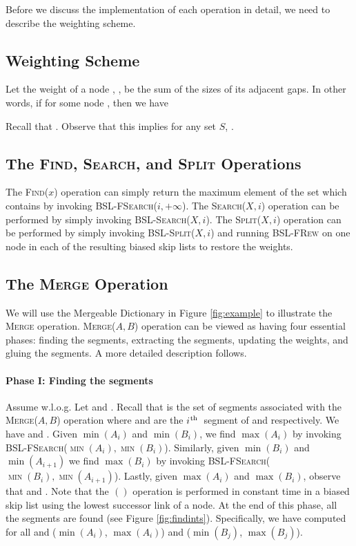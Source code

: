 \documentclass[11pt]{article}
\newcommand{\ens}[1]{\ensuremath{#1}}
\newcommand{\ith}{\ens{i^{\mbox{\hspace{.2mm}\scriptsize th}}}}
\newcommand{\Ds}{Mergeable Dictionary}
\newcommand{\kwMs}{Make-Set}
\newcommand{\kwSpl}{Split}
\newcommand{\kwUnion}{Merge}
\newcommand{\kwSrc}{Search}
\newcommand{\kwFind}{Find}
\newcommand{\Ms}{\mbox{\textsc{\kwMs}}}
\newcommand{\Spl}{\mbox{\textsc{\kwSpl}}}
\newcommand{\Splx}[2]{\mbox{\textsc{\kwSpl(\ensuremath{#1,#2})}}}
\newcommand{\Union}{\mbox{\textsc{\kwUnion{}}}}
\newcommand{\Unionx}[2]{\mbox{\textsc{\kwUnion(\ensuremath{#1,#2})}}}
\newcommand{\Src}{\mbox{\textsc{\kwSrc}}}
\newcommand{\Srcx}[2]{\mbox{\textsc{\kwSrc(\ensuremath{#1,#2})}}}
\newcommand{\Find}{\mbox{\textsc{\kwFind}}}
\newcommand{\Findx}[1]{\mbox{\textsc{\kwFind(\ensuremath{#1})}}}
\newcommand{\Bslfsrcx}[2]{\mbox{\textsc{BSL-FSearch(\ensuremath{#1,#2})}}}
\newcommand{\Bslfrew}{\mbox{\textsc{BSL-FRew}}}
\newcommand{\Bslsrcx}[2]{\mbox{\textsc{BSL-Search(\ensuremath{#1,#2})}}}
\newcommand{\Bslsplx}[2]{\mbox{\textsc{BSL-Split(\ensuremath{#1,#2})}}}
\newcommand{\segments}{{\segment}s}
\newcommand{\segment}{segment}
\newcommand{\intmax}[1]{\ensuremath{\max(\intl #1)}}
\newcommand{\intmin}[1]{\ensuremath{\min(\intl #1)}}
\newcommand{\intl}[1]{\ensuremath{#1}}
\newcommand{\set}[1]{\ensuremath{#1}}
\newcommand{\suc}[2]{\text{succ}\ensuremath{_{#1}(#2)}}
\newcommand{\hide}[1]{}
\begin{document}
  
Before we discuss the implementation of each operation in detail, we need to describe the weighting scheme. 

\subsection{Weighting Scheme} 
\label{subsec:DSWeights} 
Let the weight of a node , , be the sum of the sizes of its adjacent gaps. In other words, if  for some node , then we have 
 
Recall that . Observe that this implies for any set \set S, . 

\subsection{The \hide{\Ms{}, }\Find{}, \Src{}, and \Spl{} Operations} 
\label{subsec:DSOthers} 


The \Findx{x} operation can simply return the maximum element of the set which contains  by invoking \Bslfsrcx{i}{+\infty}. The \Srcx{X}{i} operation can be performed by simply invoking \Bslsrcx{X}{i}. The \Splx{X}{i} operation can be performed by simply invoking \Bslsplx{X}{i} and running \Bslfrew{} on one node in each of the resulting biased skip lists to restore the weights. 


\subsection{The \Union{} Operation} 
\label{subsec:DSUnion} 
We will use the \Ds{} in Figure \ref{fig:example} to illustrate the \Union{} operation. \Unionx{A}{B} operation can be viewed as having four essential phases: finding the \segments{}, extracting the \segments{}, updating the weights, and gluing the \segments{}. 
A more detailed description follows. 




\paragraph{Phase I: Finding the \segments{}} 
Assume  w.l.o.g. Let  and . Recall that  is the set of \segments{} associated with the \Unionx{A}{B} operation where  and  are the \ith\ \segment{} of  and  respectively. We have  and . Given \intmin{A_i} and \intmin{B_i}, we find \intmax{A_i} by invoking \Bslfsrcx{\intmin{A_i}}{\intmin{B_i}}. Similarly, given \intmin{B_i} and \intmin{A_{i+1}} we find \intmax{B_i} by invoking \Bslfsrcx{\intmin{B_i}}{\intmin{A_{i+1}}}. Lastly, given \intmax{A_i} and \intmax{B_i}, observe that  and . 
Note that the \suc{}{} operation is performed in constant time in a biased skip list using the lowest successor link of a node. 
At the end of this phase, all the \segments{} are found (see Figure \ref{fig:findints}). Specifically, we have computed for all  and  (\intmin{A_i}, \intmax{A_i}) and (\intmin{B_j}, \intmax{B_j}). 
\end{document}
